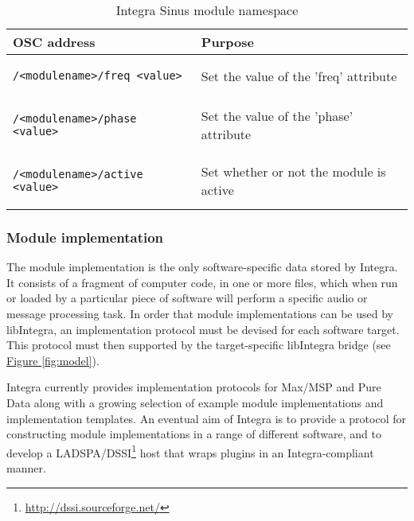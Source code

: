 \begin{table}
\begin{center}
\begin{tabular}{|p{13em}|p{8em}|}
\hline
\textbf{OSC address} & \textbf{Purpose} \\
\hline
\begin{minipage}[0pt]{10em}
\footnotesize {
\begin{verbatim}/<modulename>/freq <value>\end{verbatim}}\end{minipage}  & \small{Set the value of the 'freq' attribute} \\
\hline
\begin{minipage}[0pt]{10em}
\footnotesize {
\begin{verbatim}/<modulename>/phase <value>\end{verbatim}}\end{minipage}  & \small{Set the value of the 'phase' attribute} \\
\hline
\begin{minipage}[0pt]{10em}
\footnotesize {
\begin{verbatim}/<modulename>/active <value>
\end{verbatim}} \end{minipage} & \small{Set whether or not the module is active} \\
\hline
\end{tabular} 
\end{center}
\caption{Integra Sinus module namespace}
\label{tab:module_namespace}
\end{table}

\subsubsection{Module implementation}\label{subsubsec:module_implementation}

The module implementation is the only software-specific data stored by Integra. It consists of a fragment of computer code, in one or more files, which when run or loaded by a particular piece of software will perform a specific audio or message processing task. In order that module implementations can be used by libIntegra, an implementation protocol must be devised for each software target. This protocol must then supported by the target-specific libIntegra bridge (see \hyperref[fig:model]{Figure \ref*{fig:model}}).

Integra currently provides implementation protocols for Max/MSP and Pure Data along with a growing selection of example module implementations and implementation templates. An eventual aim of Integra is to provide a protocol for constructing module implementations in a range of different software, and to develop a LADSPA/DSSI\footnote{\url{http://dssi.sourceforge.net/}} host that wraps plugins in an Integra-compliant manner.

